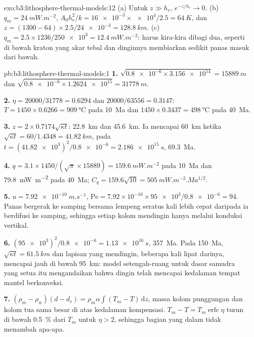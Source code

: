 \begin{solution}{exo:b3:lithosphere-thermal-models:12}
(a) Untuk $z \gg h_r$, $e^{-z/h_r} \to 0$. (b) $q_m = \qty{24}{mW.m^{-2}}$,
$A_0h_r^2/k = \num{16e-3}\times\num{e4}/2.5 = \qty{64}{K}$, dan $z = (1300 -
64)\times2.5/\num{24e-3} = \qty{128.8}{km}$. (c) $q_m = 2.5\times1236/\num{250e3}
= \qty{12.4}{mW.m^{-2}}$:  harus kira-kira dibagi dua, seperti di bawah
kraton yang akar tebal dan dinginnya membiarkan sedikit panas masuk dari bawah.
\end{solution}

\begin{solution}{pb:b3:lithosphere-thermal-models:1}
\textbf{1.} $\sqrt{\num{0.8e-6}\times\num{3.156e14}} = \qty{15889}{m}$ dan
$\sqrt{\num{0.8e-6}\times\num{1.2624e15}} = \qty{31778}{m}$.

\textbf{2.} $\eta = 20000/31778 = 0.6294$ dan $20000/63556 = 0.3147$:
$T = 1450\times0.6266 = \qty{909}{\celsius}$ pada \qty{10}{Ma} dan
$1450\times0.3437 = \qty{498}{\celsius}$ pada \qty{40}{Ma}.

\textbf{3.} $z = 2\times0.7174\sqrt{\kappa t}$: \qty{22.8}{km} dan
\qty{45.6}{km}. Ia mencapai \qty{60}{km} ketika $\sqrt{\kappa t} = 60/1.4348 =
\qty{41.82}{km}$, pada $t = (\num{41.82e3})^2/\num{0.8e-6} = \qty{2.186e15}{s}$,
\qty{69.3}{Ma}.

\textbf{4.} $q = 3.1\times1450/(\sqrt\pi\times15889) = \qty{159.6}{mW.m^{-2}}$ pada
\qty{10}{Ma} dan \qty{79.8}{mW.m^{-2}} pada \qty{40}{Ma}; $C_q = 159.6\sqrt{10}
= \qty{505}{mW.m^{-2}.Ma^{1/2}}$.

\textbf{5.} $u = \qty{7.92e-10}{m.s^{-1}}$, $\mathrm{Pe} = 7.92\times10^{-10}
\times\num{95e3}/\num{0.8e-6} = 94$. Panas bergerak ke samping bersama lempeng
seratus kali lebih cepat daripada ia berdifusi ke samping, sehingga setiap
kolom mendingin hanya melalui konduksi vertikal.

\textbf{6.} $(\num{95e3})^2/\num{0.8e-6} = \qty{1.13e16}{s}$, \qty{357}{Ma}.
Pada \qty{150}{Ma}, $\sqrt{\kappa t} = \qty{61.5}{km}$ dan lapisan yang mendingin,
beberapa kali lipat darinya, mencapai jauh di bawah \qty{95}{km}: model setengah-ruang untuk dasar samudra yang setua itu
mengandaikan bahwa dingin telah mencapai kedalaman tempat mantel berkonveksi.

\textbf{7.} $(\rho_m - \rho_w)(d - d_r) = \rho_m\alpha\int(T_m - T)\,\mathrm dz$,
massa kolom punggungan dan kolom tua sama besar di atas
kedalaman kompensasi. $T_m - T = T_m\operatorname{erfc}\eta$ turun di bawah
\qty{0.5}{\percent} dari $T_m$ untuk $\eta > 2$, sehingga bagian yang dalam tidak menambah apa-apa.


\end{solution}
